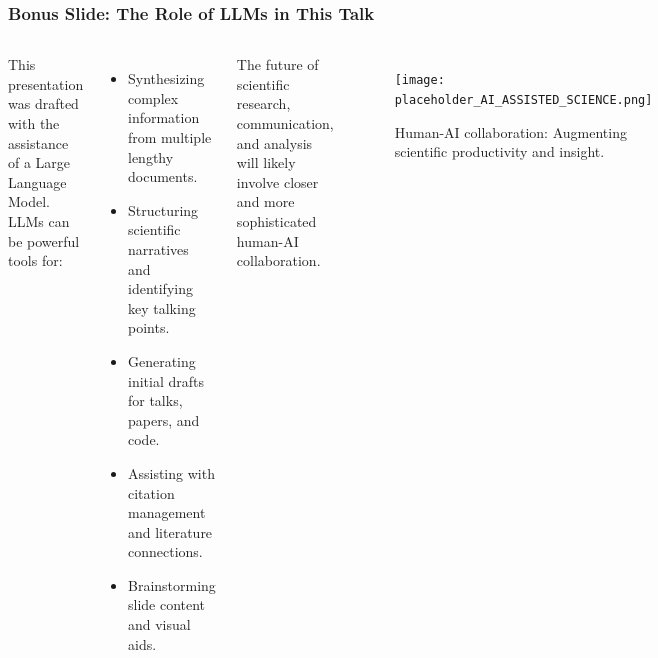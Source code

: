 \documentclass[aspectratio=169]{beamer}
\begin{document}
\begin{frame}
    \frametitle{Bonus Slide: The Role of LLMs in This Talk}
    \begin{columns}[T]
            This presentation was drafted with the assistance of a Large Language Model.
            \vspace{1em}
            LLMs can be powerful tools for:
            \begin{itemize}
                \item Synthesizing complex information from multiple lengthy documents.
                \item Structuring scientific narratives and identifying key talking points.
                \item Generating initial drafts for talks, papers, and code.
                \item Assisting with citation management and literature connections.
                \item Brainstorming slide content and visual aids.
            \end{itemize}
            \vspace{1em}
            The future of scientific research, communication, and analysis will likely involve closer and more sophisticated human-AI collaboration.
        \begin{figure}
            \centering
            \texttt{[image: placeholder\_AI\_ASSISTED\_SCIENCE.png]}
            \caption{Human-AI collaboration: Augmenting scientific productivity and insight.}
        \end{figure}
    \end{columns}
\end{frame}
\end{document}
